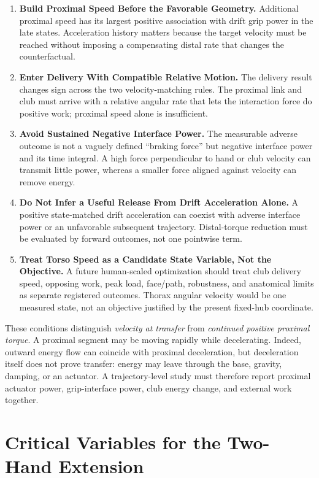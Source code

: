 \documentclass[
  letterpaper,
]{report}
\providecommand{\tightlist}{%
  \setlength{\itemsep}{0pt}\setlength{\parskip}{0pt}}
\begin{document}
\begin{enumerate}
\def\labelenumi{\arabic{enumi}.}
\tightlist
\item
  \textbf{Build Proximal Speed Before the Favorable Geometry.}
  Additional proximal speed has its largest positive association with
  drift grip power in the late states. Acceleration history matters
  because the target velocity must be reached without imposing a
  compensating distal rate that changes the counterfactual.
\item
  \textbf{Enter Delivery With Compatible Relative Motion.} The delivery
  result changes sign across the two velocity-matching rules. The
  proximal link and club must arrive with a relative angular rate that
  lets the interaction force do positive work; proximal speed alone is
  insufficient.
\item
  \textbf{Avoid Sustained Negative Interface Power.} The measurable
  adverse outcome is not a vaguely defined ``braking force'' but
  negative interface power and its time integral. A high force
  perpendicular to hand or club velocity can transmit little power,
  whereas a smaller force aligned against velocity can remove energy.
\item
  \textbf{Do Not Infer a Useful Release From Drift Acceleration Alone.}
  A positive state-matched drift acceleration can coexist with adverse
  interface power or an unfavorable subsequent trajectory. Distal-torque
  reduction must be evaluated by forward outcomes, not one pointwise
  term.
\item
  \textbf{Treat Torso Speed as a Candidate State Variable, Not the
  Objective.} A future human-scaled optimization should treat club
  delivery speed, opposing work, peak load, face/path, robustness, and
  anatomical limits as separate registered outcomes. Thorax angular
  velocity would be one measured state, not an objective justified by
  the present fixed-hub coordinate.
\end{enumerate}

These conditions distinguish \emph{velocity at transfer} from
\emph{continued positive proximal torque}. A proximal segment may be
moving rapidly while decelerating. Indeed, outward energy flow can
coincide with proximal deceleration, but deceleration itself does not
prove transfer: energy may leave through the base, gravity, damping, or
an actuator. A trajectory-level study must therefore report proximal
actuator power, grip-interface power, club energy change, and external
work together.

\section{Critical Variables for the Two-Hand
Extension}\label{critical-variables-for-the-two-hand-extension}
\end{document}
